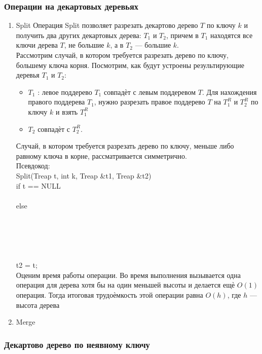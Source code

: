 \documentclass[a4paper]{article}
\begin{document}
\subsubsection{Операции на декартовых деревьях}
\begin{enumerate}
	\item Split
	Операция Split позволяет разрезать декартово дерево $T$ по ключу $k$ и получить два других декартовых дерева: $T_1$ и $T_2$, причем в $T_1$ находятся
все ключи дерева $T$, не большие $k$, а в $T_2$ — большие $k$. \\
Рассмотрим случай, в котором требуется разрезать дерево по ключу, большему ключа корня. Посмотрим, как будут устроены результирующие деревья $T_1$ и $T_2$:
\begin{itemize}
	\item $T_1$ : левое поддерево $T_1$ совпадѐт с левым поддеревом $T$. Для нахождения правого поддерева $T_1$, нужно разрезать правое поддерево $T$ на $T_1^R$ и $T_2^R$ по ключу $k$ и взять $T_1^R$
	\item $T_2$ совпадѐт с $T_2^R$.
\end{itemize}
Случай, в котором требуется разрезать дерево по ключу, меньше либо равному ключа в корне, рассматривается симметрично. \\
Псевдокод: \\
Split(Treap t, int k, Treap \&t1, Treap \&t2) \\
if t == NULL\\
	\\
else \\
 	\\
 		\\
 		\\
 	\\
 		\\
 t2 = t;\\
Оценим время работы операции. Во время выполнения вызывается одна операция для дерева хотя бы на один меньшей высоты и делается ещѐ $O(1)$ операция. Тогда итоговая трудоѐмкость этой операции равна $O(h)$, где $h$ — высота дерева

\item Merge

\end{enumerate}
\subsubsection{Декартово дерево по неявному ключу}
\end{document}
